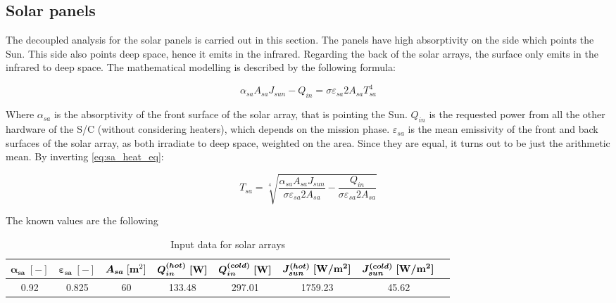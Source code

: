 \subsection{Solar panels}
\label{subsec:solar_arrays_sizing}

The decoupled analysis for the solar panels is carried out in this section. The panels have high absorptivity on the side which points the Sun. This side also points deep space, hence it emits in the infrared. Regarding the back of the solar arrays, the surface only emits in the infrared to deep space.
The mathematical modelling is described by the following formula:

\begin{equation}
    \alpha_{sa}A_{sa} J_{sun} - Q_{in} = \sigma \varepsilon_{sa} 2 A_{sa} T_{sa}^4
    \label{eq:sa_heat_eq}
\end{equation}

Where $\alpha_{sa}$ is the absorptivity of the front surface of the solar array, that is pointing the Sun. $Q_{in}$ is the requested power from all the other hardware of the S/C (without considering heaters), which depends on the mission phase. $\varepsilon_{sa}$ is the mean emissivity of the front and back surfaces of the solar array, as both irradiate to deep space, weighted on the area. Since they are equal, it turns out to be just the arithmetic mean. 
By inverting \autoref{eq:sa_heat_eq}:

\begin{equation}
    T_{sa} = \sqrt [4] {\frac{\alpha_{sa}A_{sa} J_{sun}}{\sigma  \varepsilon_{sa}2 A_{sa}} - \frac{Q_{in}}{\sigma \varepsilon_{sa}2 A_{sa}}}
\end{equation}

The known values are the following

\begin{table}[H]
    \renewcommand{\arraystretch}{1.5}
    \centering
    \begin{tabular}{|c|c|c|c|c|c|c|c|}
        \hline
        $\boldsymbol{\alpha_{sa} \; [-]}$ & $\boldsymbol{\varepsilon_{sa} \; [-]}$ & $\boldsymbol{A_{sa}}\;[\textrm{\textbf{m}}^2]$ & $\boldsymbol{Q_{in}^{(hot)} \; [\textrm{\textbf{W}}]}$ & $\boldsymbol{Q_{in}^{(cold)} \; [\textrm{\textbf{W}}]}$ & $\boldsymbol{J_{sun}^{(hot)} \; [\textrm{\textbf{W}}/\textrm{\textbf{m}}^2]}$ & $\boldsymbol{J_{sun}^{(cold)} \; [\textrm{\textbf{W}}/\textrm{\textbf{m}}^2]}$ \\
        \hline
        0.92 & 0.825 & 60 &  133.48 & 297.01 & 1759.23 & 45.62 \\
        \hline
    \end{tabular}
    \caption{Input data for solar arrays}
    \label{table:sa_data}
\end{table}

